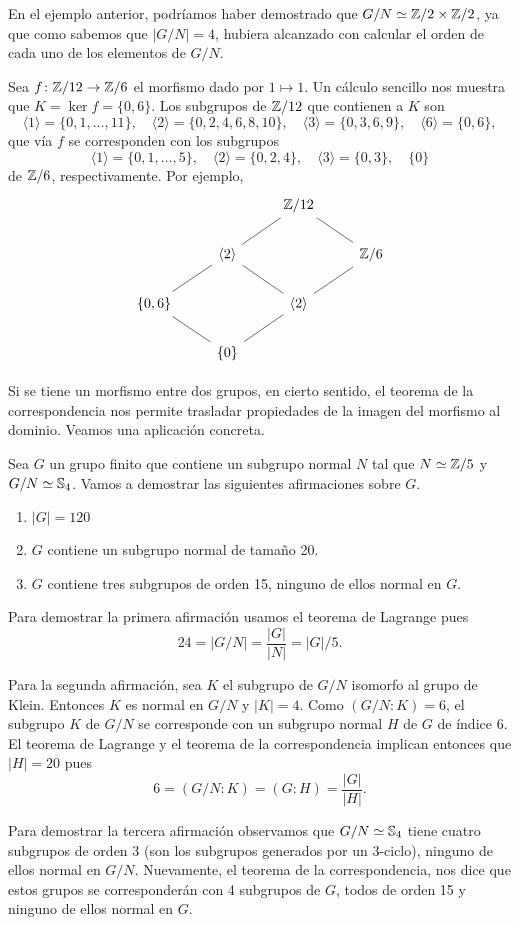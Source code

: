 En el ejemplo anterior, podríamos haber demostrado que 
$G/N\simeq\mathbb{Z}/2\times\mathbb{Z}/2$, ya que como sabemos que $|G/N|=4$, hubiera alcanzado con calcular el orden de cada uno de los elementos de $G/N$. 

\begin{example}
Sea $f\colon\mathbb{Z}/12\to\mathbb{Z}/6$ el morfismo dado por $1\mapsto 1$. Un cálculo sencillo nos muestra que $K=\ker f=\{0,6\}$. 
Los subgrupos de $\mathbb{Z}/12$ que contienen a $K$ son 
\[
\langle 1\rangle=\{0,1,\dots,11\},
\quad
\langle 2\rangle=\{0,2,4,6,8,10\},
\quad
\langle 3\rangle=\{0,3,6,9\},
\quad
\langle 6\rangle=\{0,6\},
\] 
que vía $f$ se corresponden con los subgrupos 
\[
\langle 1\rangle=\{0,1,\dots,5\},
\quad
\langle 2\rangle=\{0,2,4\},
\quad
\langle 3\rangle=\{0,3\},
\quad
\{0\}
\]
de $\mathbb{Z}/6$, respectivamente. Por ejemplo, 
\[
\begin{tikzcd}
	&& \Z/12 \\
	& \langle 2\rangle && {\Z/6} \\
	\{0,6\} && \langle 2\rangle \\
	& {\{0\}}
	\arrow[no head, from=1-3, to=2-4]
	\arrow[no head, from=1-3, to=2-2]
	\arrow[no head, from=2-2, to=3-1]
	\arrow[no head, from=3-1, to=4-2]
	\arrow[no head, from=2-2, to=3-3]
	\arrow[no head, from=3-3, to=4-2]
	\arrow[no head, from=2-4, to=3-3]
\end{tikzcd}
\]
\end{example}

Si se tiene un morfismo entre dos grupos,  
en cierto sentido, el teorema de la correspondencia nos permite trasladar propiedades de la
imagen del morfismo al dominio. Veamos una aplicación concreta.

\begin{example}
Sea $G$ un grupo finito que contiene un subgrupo normal $N$ tal que $N\simeq\mathbb{Z}/5$ y $G/N\simeq\mathbb{S}_4$. Vamos a demostrar las siguientes afirmaciones sobre $G$.
\begin{enumerate}
\item $|G|=120$
\item $G$ contiene un subgrupo normal de tamaño 20.
\item $G$ contiene tres subgrupos de orden 15, ninguno de ellos normal en $G$.
\end{enumerate}

Para demostrar la primera afirmación usamos el teorema de Lagrange pues
\[
24=|G/N|=\frac{|G|}{|N|}=|G|/5.
\]

Para la segunda afirmación, sea $K$ el subgrupo de $G/N$ isomorfo al grupo de Klein. Entonces
$K$ es normal en $G/N$ y $|K|=4$. Como
$(G/N:K)=6$,  
el subgrupo $K$ de $G/N$ se corresponde con un subgrupo normal $H$ de $G$ de índice 6. El teorema de Lagrange y el teorema de la correspondencia implican entonces que $|H|=20$ pues
\[
6=(G/N:K)=(G:H)=\frac{|G|}{|H|}.
\] 

Para demostrar la tercera afirmación observamos que $G/N\simeq\mathbb{S}_4$ tiene cuatro subgrupos de orden 3 (son los subgrupos generados por un 3-ciclo), 
ninguno de ellos normal en $G/N$. Nuevamente, el teorema de la correspondencia, nos dice que estos grupos se corresponderán con 4 subgrupos de $G$, todos de orden 15 y ninguno de ellos normal en $G$.
\end{example}

